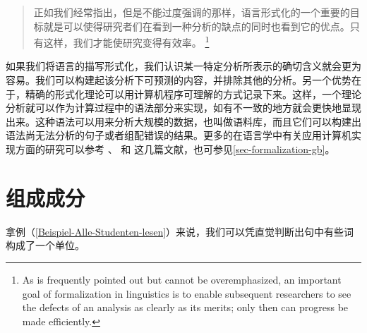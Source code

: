 \begin{quotation}
正如我们经常指出，但是不能过度强调的那样，语言形式化的一个重要的目标就是可以使得研究者们在看到一种分析的缺点的同时也看到它的优点。只有这样，我们才能使研究变得有效率。
\citep[]{Dowty79a}\footnote{%
As is frequently pointed out but cannot be overemphasized, an important goal
of formalization in linguistics is to enable subsequent researchers to see the defects
of an analysis as clearly as its merits; only then can progress be made efficiently.}
\end{quotation}
%
如果我们将语言的描写形式化，我们认识某一特定分析所表示的确切含义就会更为容易。我们可以构建起该分析下可预测的内容，并排除其他的分析。另一个优势在于，精确的形式化理论可以用计算机程序可理解的方式记录下来。这样，一个理论分析就可以作为计算过程中的语法部分来实现，如有不一致的地方就会更快地显现出来。这种语法可以用来分析大规模的数据，也叫做语料库，而且它们可以构建出语法尚无法分析的句子或者组配错误的结果。更多的在语言学中有关应用计算机实现方面的研究可以参考 、 和  这几篇文献，也可参见\ref{sec-formalization-gb}。

\section{组成成分}
\label{konstituententests}\label{sec-constituents}

拿例（\ref{Beispiel-Alle-Studenten-lesen}）来说，我们可以凭直觉判断出句中有些词构成了一个单位。

